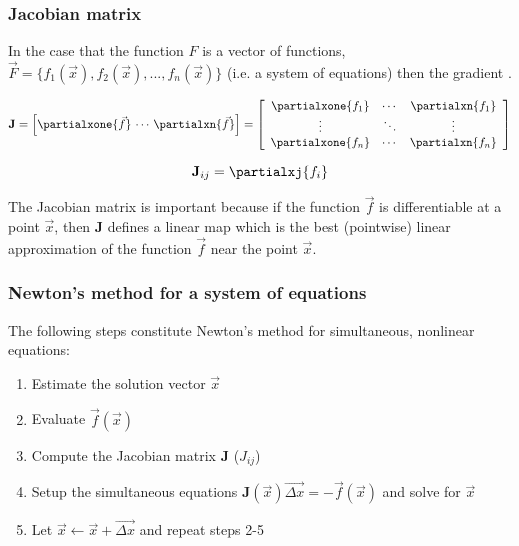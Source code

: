 \documentclass[hyperref={colorlinks=true}]{beamer}
\begin{document}
\begin{frame}%
  \frametitle{Jacobian matrix}

  In the case that the function $F$ is a vector of functions, $\vec{F} = \{f_1(\vec{x}), f_2(\vec{x}), ..., f_n(\vec{x})\}$ (i.e. a system of equations) then the gradient  .
  
  \begin{equation}
    \mathbf {J} = \left[ \partialxone{\vec{f}} \, \cdots \, \partialxn{\vec{f}} \right]%
                = \left[ \begin{array}{c c c}
                             \partialxone{f_1} & \cdots & \partialxn{f_1} \\
                             \vdots            & \ddots & \vdots \\
                             \partialxone{f_n} & \cdots & \partialxn{f_n} 
                           \end{array}\right]
  \end{equation}
  

  \begin{equation}
    \mathbf{J}_{ij}= \partialxj{f_i}
  \end{equation}

  The Jacobian matrix is important because if the function $\vec{f}$ is differentiable at a point $\vec{x}$, then $\mathbf{J}$ defines a linear map which is the best (pointwise) linear approximation of the function $\vec{f}$ near the point $\vec{x}$.
  
  \centering {}

\end{frame}


\begin{frame}%
  \frametitle{Newton's method for a system of equations}

  The following steps constitute Newton's method for simultaneous, nonlinear equations:
  
  \begin{enumerate}
    \item Estimate the solution vector $\vec{x}$
    \item Evaluate $\vec{f}(\vec{x})$
    \item Compute the Jacobian matrix $\mathbf{J}$ ($J_{ij}$)
    \item Setup the simultaneous equations $\mathbf{J}(\vec{x}) \vec{\Delta x} = - \vec{f}(\vec{x})$  and solve for $\vec{x}$
    \item Let $\vec{x}\leftarrow \vec{x} + \vec{\Delta x}$ and repeat steps 2-5
  \end{enumerate}

\end{frame}
\end{document}
